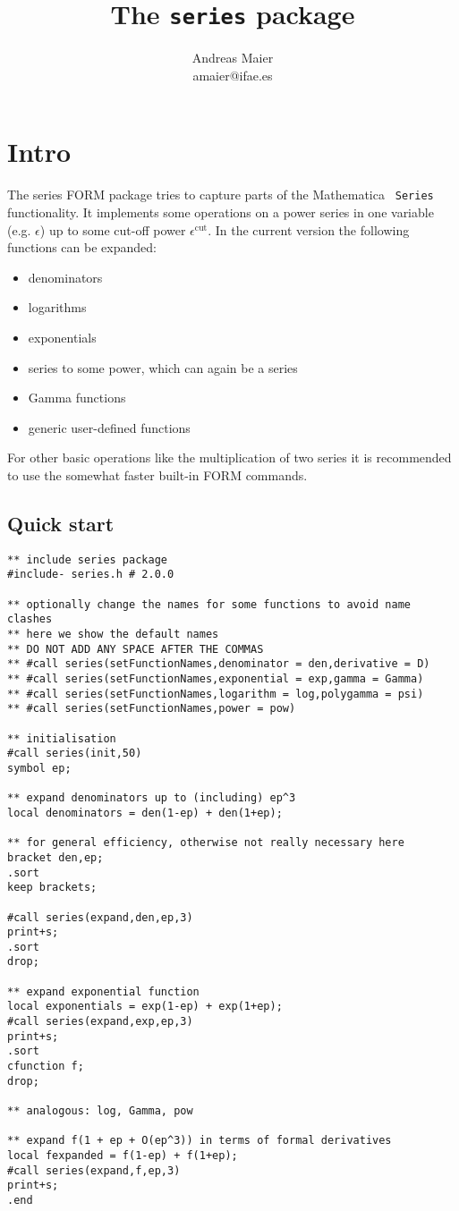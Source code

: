 \documentclass[titlepage]{article}
\begin{document}
\title{The \texttt{series} package}
\author{Andreas Maier\\amaier@ifae.es}
\maketitle

\tableofcontents

\section{Intro}

The series FORM package tries to capture parts of the Mathematica {\tt
  Series} functionality. It implements some operations on a power
series in one variable
(e.g. $\epsilon$) up to some cut-off power $\epsilon^{\text{cut}}$. In
the current version the following functions can be expanded:
\begin{itemize}
\item denominators
\item logarithms
\item exponentials
\item series to some power, which can again be a series
\item Gamma functions
\item generic user-defined functions
\end{itemize}
For other basic operations like the multiplication of two series it
is recommended to use the somewhat faster built-in FORM commands.

\subsection{Quick start}
\label{sec:quick}

\begin{lstlisting}
** include series package
#include- series.h # 2.0.0

** optionally change the names for some functions to avoid name clashes
** here we show the default names
** DO NOT ADD ANY SPACE AFTER THE COMMAS
** #call series(setFunctionNames,denominator = den,derivative = D)
** #call series(setFunctionNames,exponential = exp,gamma = Gamma)
** #call series(setFunctionNames,logarithm = log,polygamma = psi)
** #call series(setFunctionNames,power = pow)

** initialisation
#call series(init,50)
symbol ep;

** expand denominators up to (including) ep^3
local denominators = den(1-ep) + den(1+ep);

** for general efficiency, otherwise not really necessary here
bracket den,ep;
.sort
keep brackets;

#call series(expand,den,ep,3)
print+s;
.sort
drop;

** expand exponential function
local exponentials = exp(1-ep) + exp(1+ep);
#call series(expand,exp,ep,3)
print+s;
.sort
cfunction f;
drop;

** analogous: log, Gamma, pow

** expand f(1 + ep + O(ep^3)) in terms of formal derivatives
local fexpanded = f(1-ep) + f(1+ep);
#call series(expand,f,ep,3)
print+s;
.end
\end{lstlisting}
\end{document}
